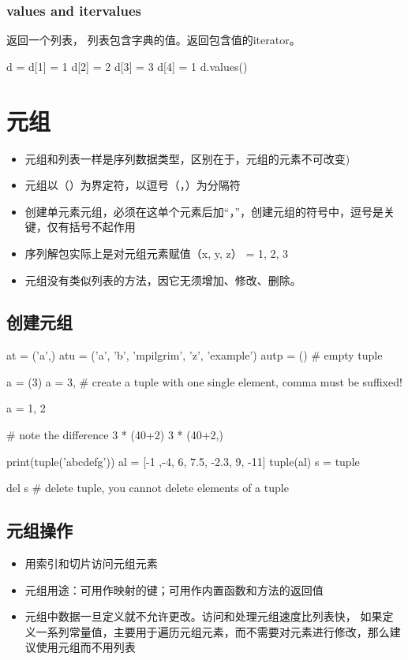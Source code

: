 \subsubsection{values and itervalues}
返回一个列表， 列表包含字典的值。返回包含值的iterator。
\begin{python}
d = {}
d[1] = 1
d[2] = 2
d[3] = 3
d[4] = 1
d.values()
\end{python}

\section{元组}
\begin{itemize}
\item 元组和列表一样是序列数据类型，区别在于，元组的元素不可改变)
\item 元组以（）为界定符，以逗号（，）为分隔符
\item 创建单元素元组，必须在这单个元素后加“，”，创建元组的符号中，逗号是关键，仅有括号不起作用
\item 序列解包实际上是对元组元素赋值（x, y, z） = 1, 2, 3
\item 元组没有类似列表的方法，因它无须增加、修改、删除。
\end{itemize}
\subsection{创建元组}
\begin{python}
at = ('a',)
atu = ('a', 'b', 'mpilgrim', 'z', 'example')
autp = ()  #  empty tuple

a = (3)
a = 3,  # create a tuple with one single element, comma must be suffixed!

a = 1, 2

# note the difference
3 * (40+2)
3 * (40+2,)

print(tuple('abcdefg'))
al = [-1 ,-4, 6, 7.5, -2.3, 9, -11]
tuple(al)
s = tuple

del s  #  delete tuple, you cannot delete elements of a tuple
\end{python}
\subsection{元组操作}
\begin{itemize}
\item 用索引和切片访问元组元素
\item 元组用途：可用作映射的键；可用作内置函数和方法的返回值
\item 元组中数据一旦定义就不允许更改。访问和处理元组速度比列表快， 如果定义一系列常量值，主要用于遍历元组元素，而不需要对元素进行修改，那么建议使用元组而不用列表
\end{itemize}
